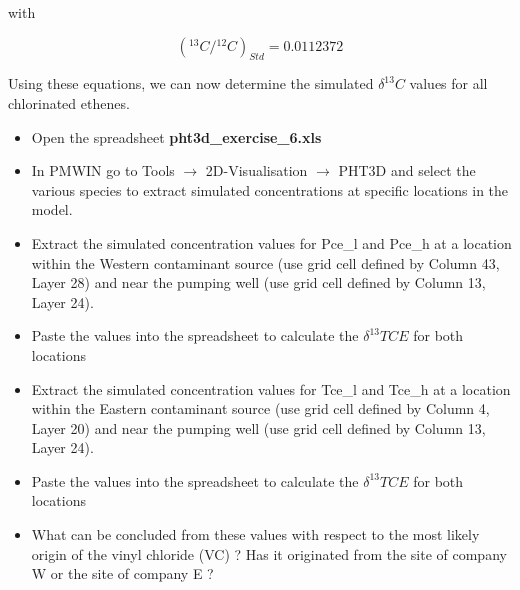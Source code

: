 with 

\begin{equation}
{ ({^{13}C} / {^{12}C})_{Std} = 0.0112372 }
\label{eq:vpdb_std}
\end{equation}

Using these equations, we can now determine the simulated $\delta ^{13}C$ values for
all chlorinated ethenes. 

\begin{itemize}

\item Open the spreadsheet {\color{red} \textbf{pht3d\_exercise\_6.xls}} 

\item In PMWIN go to Tools $\rightarrow$ 2D-Visualisation $\rightarrow$ PHT3D and select the various species to extract simulated concentrations at specific locations in the model.

\item Extract the simulated concentration values for Pce\_l and Pce\_h at a location within the Western contaminant source (use grid cell defined by Column 43, Layer 28) and near the pumping well (use grid cell defined by Column 13, Layer 24).

\item Paste the values into the spreadsheet to calculate the $\delta ^{13}TCE$ for both locations 
 
\item Extract the simulated concentration values for Tce\_l and Tce\_h at a location within the Eastern contaminant source 
(use grid cell defined by Column 4, Layer 20) and near the pumping well (use grid cell defined by Column 13, Layer 24).

\item Paste the values into the spreadsheet to calculate the $\delta ^{13}TCE$ for both locations 

\item What can be concluded from these values with respect to the most likely origin of the vinyl chloride (VC) ?
Has it originated from the site of company W or the site of company E ?

\end{itemize} 

